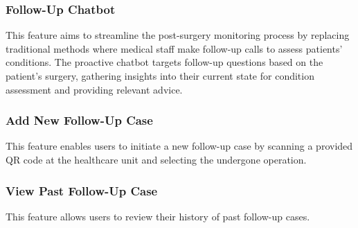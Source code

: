 \documentclass[12pt,oneside,openright,a4paper]{cpe-english-project}
\begin{document}
      \subsubsection{Follow-Up Chatbot}
      \qquad This feature aims to streamline the post-surgery monitoring process by replacing traditional methods where medical staff make follow-up calls to assess patients' conditions. The proactive chatbot targets follow-up questions based on the patient’s surgery, gathering insights into their current state for condition assessment and providing relevant advice. \par
      \subsubsection{Add New Follow-Up Case}
      \qquad This feature enables users to initiate a new follow-up case by scanning a provided QR code at the healthcare unit and selecting the undergone operation. \par
      \subsubsection{View Past Follow-Up Case}
      \qquad This feature allows users to review their history of past follow-up cases. 
\end{document}
